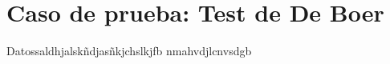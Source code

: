 \documentclass[../informe.tex]{subfiles}
\begin{document}
\section{Caso de prueba: Test de De Boer}
\label{sec:boer}
Datossaldhjalskñdjasñkjchslkjfb nmahvdjlcnvsdgb
\end{document}
